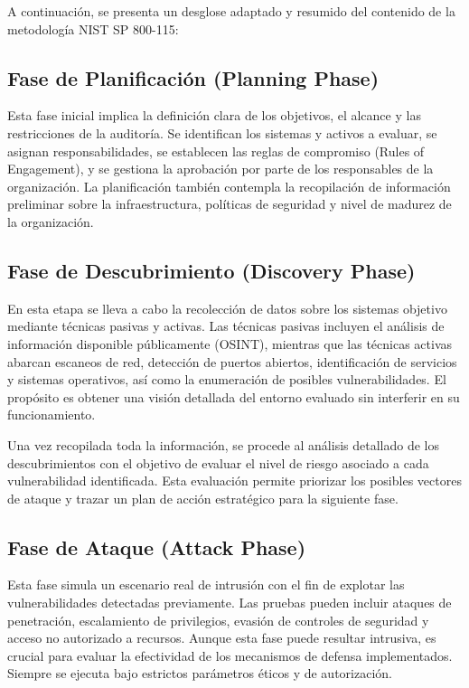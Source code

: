 \documentclass[a4paper, 11pt]{article}
\begin{document}
A continuación, se presenta un desglose adaptado y resumido del contenido de la metodología NIST SP 800-115:


\subsection{Fase de Planificación (Planning Phase)}

Esta fase inicial implica la definición clara de los objetivos, el alcance y las restricciones de la auditoría. Se identifican los sistemas y activos a evaluar, se asignan responsabilidades, se establecen las reglas de compromiso (Rules of Engagement), y se gestiona la aprobación por parte de los responsables de la organización. La planificación también contempla la recopilación de información preliminar sobre la infraestructura, políticas de seguridad y nivel de madurez de la organización.


\subsection{Fase de Descubrimiento (Discovery Phase)}

En esta etapa se lleva a cabo la recolección de datos sobre los sistemas objetivo mediante técnicas pasivas y activas. 
Las técnicas pasivas incluyen el análisis de información disponible públicamente (OSINT), mientras que las técnicas activas abarcan escaneos de red, detección de puertos abiertos, 
identificación de servicios y sistemas operativos, así como la enumeración de posibles vulnerabilidades. El propósito es obtener una visión detallada del entorno evaluado sin interferir en su funcionamiento.

\par\vspace{0.5cm}
Una vez recopilada toda la información, se procede al análisis detallado de los descubrimientos con el objetivo de evaluar el nivel de riesgo asociado a cada vulnerabilidad identificada. Esta evaluación permite priorizar los posibles vectores de ataque y trazar un plan de acción estratégico para la siguiente fase.

\subsection{Fase de Ataque (Attack Phase)}

Esta fase simula un escenario real de intrusión con el fin de explotar las vulnerabilidades detectadas previamente. Las pruebas pueden incluir ataques de penetración, escalamiento de privilegios, evasión de controles de seguridad y acceso no autorizado a recursos. Aunque esta fase puede resultar intrusiva, es crucial para evaluar la efectividad de los mecanismos de defensa implementados. Siempre se ejecuta bajo estrictos parámetros éticos y de autorización.
\end{document}
